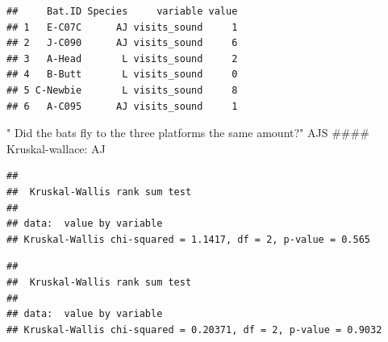 \documentclass[]{article}
\newenvironment{Shaded}{\begin{snugshade}}{\end{snugshade}}
\newcommand{\KeywordTok}[1]{\textcolor[rgb]{0.13,0.29,0.53}{\textbf{{#1}}}}
\newcommand{\DataTypeTok}[1]{\textcolor[rgb]{0.13,0.29,0.53}{{#1}}}
\newcommand{\StringTok}[1]{\textcolor[rgb]{0.31,0.60,0.02}{{#1}}}
\newcommand{\NormalTok}[1]{{#1}}
\begin{document}
\begin{verbatim}
##     Bat.ID Species     variable value
## 1   E-C07C      AJ visits_sound     1
## 2   J-C090      AJ visits_sound     6
## 3   A-Head       L visits_sound     2
## 4   B-Butt       L visits_sound     0
## 5 C-Newbie       L visits_sound     8
## 6   A-C095      AJ visits_sound     1
\end{verbatim}

\begin{Shaded}
\end{Shaded}

" Did the bats fly to the three platforms the same amount?" AJS \#\#\#\#
Kruskal-wallace: AJ

\begin{Shaded}
\end{Shaded}

\begin{verbatim}
## 
##  Kruskal-Wallis rank sum test
## 
## data:  value by variable
## Kruskal-Wallis chi-squared = 1.1417, df = 2, p-value = 0.565
\end{verbatim}

\begin{Shaded}
\end{Shaded}

\begin{verbatim}
## 
##  Kruskal-Wallis rank sum test
## 
## data:  value by variable
## Kruskal-Wallis chi-squared = 0.20371, df = 2, p-value = 0.9032
\end{verbatim}
\end{document}
